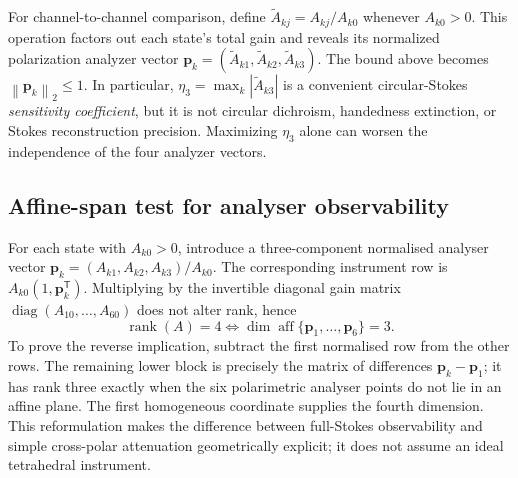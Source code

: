 \documentclass{ieeeaccess}
\newcommand{\norm}[1]{\left\lVert #1 \right\rVert}
\begin{document}
For channel-to-channel comparison, define $\widetilde A_{kj}=A_{kj}/A_{k0}$ whenever $A_{k0}>0$. This operation factors out each state's total gain and reveals its normalized polarization analyzer vector $\boldsymbol{p}_k=(\widetilde A_{k1},\widetilde A_{k2},\widetilde A_{k3})$. The bound above becomes $\norm{\boldsymbol{p}_k}_2\le1$. In particular, $\eta_3=\max_k|\widetilde A_{k3}|$ is a convenient circular-Stokes \emph{sensitivity coefficient}, but it is not circular dichroism, handedness extinction, or Stokes reconstruction precision. Maximizing $\eta_3$ alone can worsen the independence of the four analyzer vectors.

\subsection{Affine-span test for analyser observability}
For each state with \(A_{k0}>0\), introduce a three-component normalised analyser vector \(\boldsymbol p_k=(A_{k1},A_{k2},A_{k3})/A_{k0}\). The corresponding instrument row is \(A_{k0}(1,\boldsymbol p_k^{\mathsf T})\). Multiplying by the invertible diagonal gain matrix \(\operatorname{diag}(A_{10},\ldots,A_{60})\) does not alter rank, hence
\begin{equation}
\boxed{\operatorname{rank}(A)=4\iff\dim\operatorname{aff}\{\boldsymbol p_1,\ldots,\boldsymbol p_6\}=3.}
\label{eq:affine}
\end{equation}
To prove the reverse implication, subtract the first normalised row from the other rows. The remaining lower block is precisely the matrix of differences \(\boldsymbol p_k-\boldsymbol p_1\); it has rank three exactly when the six polarimetric analyser points do not lie in an affine plane. The first homogeneous coordinate supplies the fourth dimension. This reformulation makes the difference between full-Stokes observability and simple cross-polar attenuation geometrically explicit; it does not assume an ideal tetrahedral instrument.
\end{document}

